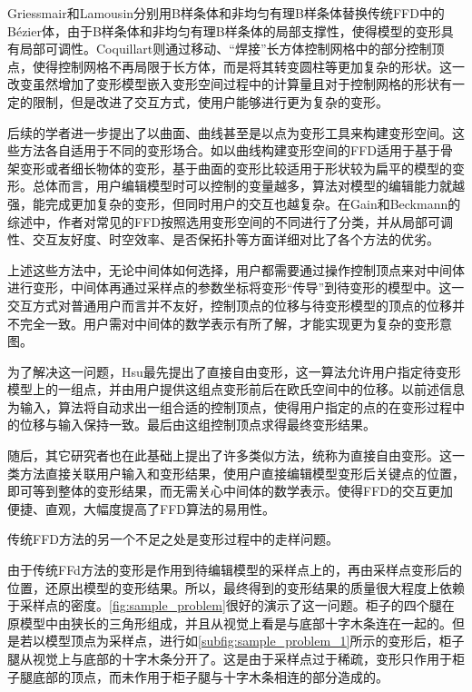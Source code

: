     Griessmair\cite{Griessmair89}和Lamousin\cite{lamousin1994}分别用B样条体和非均匀有理B样条体替换传统FFD\cite{Sederberg86}中的Bézier体，由于B样条体和非均匀有理B样条体的局部支撑性，使得模型的变形具有局部可调性。Coquillart\cite{coquillart1990}则通过移动、“焊接”长方体控制网格中的部分控制顶点，使得控制网格不再局限于长方体，而是将其转变圆柱等更加复杂的形状。这一改变虽然增加了变形模型嵌入变形空间过程中的计算量且对于控制网格的形状有一定的限制，但是改进了交互方式，使用户能够进行更为复杂的变形。

    后续的学者进一步提出了以曲面、曲线甚至是以点为变形工具来构建变形空间。这些方法各自适用于不同的变形场合。如以曲线构建变形空间的FFD适用于基于骨架变形或者细长物体的变形，基于曲面的变形比较适用于形状较为扁平的模型的变形。总体而言，用户编辑模型时可以控制的变量越多，算法对模型的编辑能力就越强，能完成更加复杂的变形，但同时用户的交互也越复杂。在Gain和Beckmann的综述\cite{Gain08}中，作者对常见的FFD按照选用变形空间的不同进行了分类，并从局部可调性、交互友好度、时空效率、是否保拓扑等方面详细对比了各个方法的优劣。

    上述这些方法中，无论中间体如何选择，用户都需要通过操作控制顶点来对中间体进行变形，中间体再通过采样点的参数坐标将变形“传导”到待变形的模型中。这一交互方式对普通用户而言并不友好，控制顶点的位移与待变形模型的顶点的位移并不完全一致。用户需对中间体的数学表示有所了解，才能实现更为复杂的变形意图。

    为了解决这一问题，Hsu\cite{hsu1992}最先提出了直接自由变形，这一算法允许用户指定待变形模型上的一组点，并由用户提供这组点变形前后在欧氏空间中的位移。以前述信息为输入，算法将自动求出一组合适的控制顶点，使得用户指定的点的在变形过程中的位移与输入保持一致。最后由这组控制顶点求得最终变形结果。

    随后，其它研究者也在此基础上提出了许多类似方法，统称为直接自由变形。这一类方法直接关联用户输入和变形结果，使用户直接编辑模型变形后关键点的位置，即可等到整体的变形结果，而无需关心中间体的数学表示。使得FFD的交互更加便捷、直观，大幅度提高了FFD算法的易用性。

    传统FFD方法的另一个不足之处是变形过程中的走样问题。

    由于传统FFd方法的变形是作用到待编辑模型的采样点上的，再由采样点变形后的位置，还原出模型的变形结果。所以，最终得到的变形结果的质量很大程度上依赖于采样点的密度。\autoref{fig:sample_problem}很好的演示了这一问题。柜子的四个腿在原模型中由狭长的三角形组成，并且从视觉上看是与底部十字木条连在一起的。但是若以模型顶点为采样点，进行如\autoref{subfig:sample_problem_1}所示的变形后，柜子腿从视觉上与底部的十字木条分开了。这是由于采样点过于稀疏，变形只作用于柜子腿底部的顶点，而未作用于柜子腿与十字木条相连的部分造成的。

